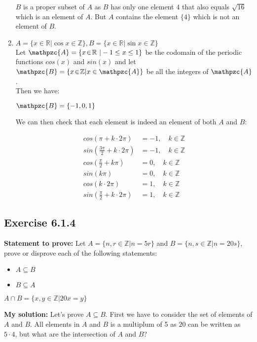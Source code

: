 \documentclass{report}
\newcommand{\cent}[1]{\begin{center}#1\end{center}}
\newcommand{\mAlign}[1]{\begin{align*}#1\end{align*}}
\newcommand{\doubleR}{\mathbb{R}}
\newcommand{\doubleZ}{\mathbb{Z}}
\newcommand{\In}{\! \in \!}
\newcommand{\script}[1]{\mathpzc{#1}}
\newcommand{\Prove}{\textbf{Statement to prove: }}
\newcommand{\solution}{\textbf{My solution: }}
\newcommand{\QED}{\boxed{}}
\newcommand{\Exercise}[1]{\subsection{Exercise #1}}
\begin{document}
\begin{enumerate}[label = \textbf{a.}]
		$B$ is a proper subset of $A$ as $B$ has only one element $4$ that also equals $\sqrt{16}$ which is an element of $A$. But $A$ contains the element $\{4\}$ which is not an element of $B$.
		
		\item $A = \{x \In \doubleR | \cos{x} \in \doubleZ\}, B = \{x \In \doubleR | \sin{x} \in \doubleZ\}$\\
		
		Let $\script{A} = \{x \In \doubleR\ | -1 \leq x \leq 1\}$ be the codomain of the periodic functions $cos(x)$ and $sin(x)$ and let $\script{B} = \{x \In \doubleZ | x \in \script{A}\}$ be all the integers of $\script{A}$.\\
		
		Then we have:
		
		\cent{$\script{B} = \{-1,0,1\}$}
		
		We can then check that each element is indeed an element of both $A$ and $B$:
		
		\mAlign{cos(\pi + k \cdot 2\pi) &= -1, \quad k \In \doubleZ\\
						sin(\frac{3\pi}{2} + k \cdot 2\pi) &= -1,  \quad k \In \doubleZ\\
						cos(\frac{\pi}{2} + k \pi) &= 0, \quad k \In \doubleZ\\
						sin(k\pi) &= 0, \quad k \In \doubleZ\\
						cos(k \cdot 2 \pi) &= 1,\quad k \In \doubleZ\\
						sin(\frac{\pi}{2} + k \cdot 2 \pi) &= 1,\quad k \In \doubleZ}
					
		\QED
	\end{enumerate}	
	
	\Exercise{6.1.4} 
		
	\Prove
	Let $A = \{n,r \In \doubleZ | n = 5r\}$ and $B = \{n,s \In \doubleZ | n = 20s\}$, prove or disprove each of the following statements:
	\begin{itemize}
		\item $A \subseteq B$
		\item $B \subseteq A$
	\end{itemize}

	\cent{$A \cap B = \{x,y \In \doubleZ | 20x = y\}$}
	
	\solution
	Let's prove $A \subseteq B$. First we have to consider the set of elements of $A$ and $B$. All elements in $A$ and $B$ is a multiplum of 5 as $20$ can be written as $5 \cdot 4$, but what are the intersection of $A$ and $B$?\\
	
\end{document}
